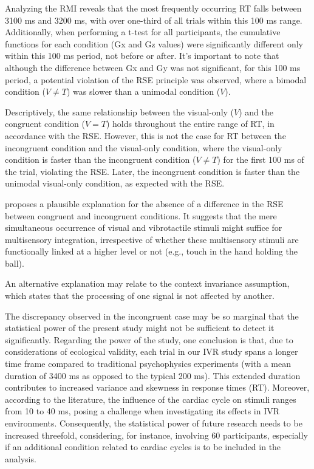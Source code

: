 \documentclass[12pt,oneside,openright]{report}
\begin{document}
Analyzing the RMI reveals that the most frequently occurring RT falls between 3100 ms and 3200 ms, with over one-third of all trials within this 100 ms range. Additionally, when performing a t-test for all participants, the cumulative functions for each condition (Gx and Gz values) were significantly different only within this 100 ms period, not before or after. It's important to note that although the difference between Gx and Gy was not significant, for this 100 ms period, a potential violation of the RSE principle was observed, where a bimodal condition ($V \neq T$) was slower than a unimodal condition ($V$).

Descriptively, the same relationship between the visual-only ($V$) and the congruent condition ($V=T$) holds throughout the entire range of RT, in accordance with the RSE. However, this is not the case for RT between the incongruent condition and the visual-only condition, where the visual-only condition is faster than the incongruent condition ($V \neq T$) for the first 100 ms of the trial, violating the RSE. Later, the incongruent condition is faster than the unimodal visual-only condition, as expected with the RSE.

\Cite{RSE_FBI} proposes a plausible explanation for the absence of a difference in the RSE between congruent and incongruent conditions. It suggests that the mere simultaneous occurrence of visual and vibrotactile stimuli might suffice for multisensory integration, irrespective of whether these multisensory stimuli are functionally linked at a higher level or not (e.g., touch in the hand holding the ball).

An alternative explanation may relate to the context invariance assumption, which states that the processing of one signal is not affected by another.

The discrepancy observed in the incongruent case may be so marginal that the statistical power of the present study might not be sufficient to detect it significantly. Regarding the power of the study, one conclusion is that, due to considerations of ecological validity, each trial in our IVR study spans a longer time frame compared to traditional psychophysics experiments (with a mean duration of 3400 ms as opposed to the typical 200 ms). This extended duration contributes to increased variance and skewness in response times (RT). Moreover, according to the literature, the influence of the cardiac cycle on stimuli ranges from 10 to 40 ms, posing a challenge when investigating its effects in IVR environments. Consequently, the statistical power of future research needs to be increased threefold, considering, for instance, involving 60 participants, especially if an additional condition related to cardiac cycles is to be included in the analysis.
\end{document}
